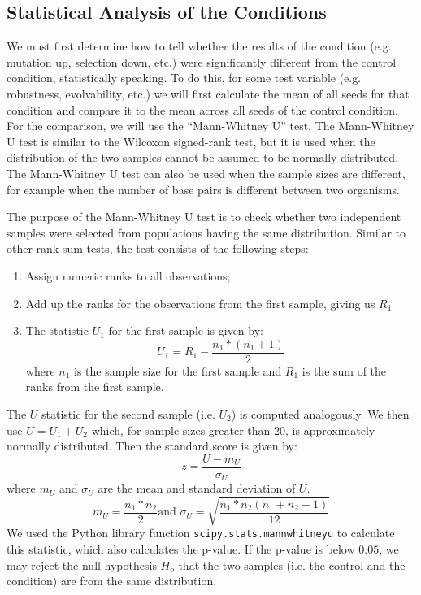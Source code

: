 \subsection{Statistical Analysis of the Conditions}
We must first determine how to tell whether the results of the condition (e.g. mutation up, selection down, etc.) were significantly different from the control condition, statistically speaking. To do this, for some test variable (e.g. robustness, evolvability, etc.) we will first calculate the mean of all seeds for that condition and compare it to the mean across all seeds of the control condition. For the comparison,  we will use the ``Mann-Whitney U'' test. The Mann-Whitney U test is similar to the Wilcoxon signed-rank test, but it is used when the distribution of the two samples cannot be assumed to be normally distributed. The Mann-Whitney U test can also be used when the sample sizes are different, for example when the number of base pairs is different between two organisms. 

The purpose of the Mann-Whitney U test is to check whether two independent samples were selected from populations having the same distribution. Similar to other rank-sum tests, the test consists of the following steps:
\begin{enumerate}
	\item Assign numeric ranks to all observations;
	\item Add up the ranks for the observations from the first sample, giving us $R_1$
	\item The statistic $U_1$ for the first sample is given by:
	\begin{equation*}
	U_1 = R_1 - \frac{n_1*(n_1 + 1)}{2}
	\end{equation*}
	where $n_1$ is the sample size for the first sample and $R_1$ is the sum of the ranks from the first sample.
\end{enumerate}
The $U$ statistic for the second sample (i.e. $U_2$) is computed analogously. We then use $U = U_1 + U_2$ which, for sample sizes greater than 20, is approximately normally distributed. Then the standard score is given by:
\begin{equation*}
z = \frac{U - m_U}{\sigma_U}
\end{equation*}
where $m_U$ and $\sigma_U$ are the mean and standard deviation of $U$.
\begin{equation*}
m_U = \frac{n_1*n_2}{2} \text{and } \sigma_U = \sqrt{\frac{n_1*n_2\left(n_1 + n_2 +1\right)}{12}}
\end{equation*} We used the Python library function \texttt{scipy.stats.mannwhitneyu} to calculate this statistic, which also calculates the p-value. If the p-value is below $0.05$, we may reject the null hypothesis $H_o$ that the two samples (i.e. the control and the condition) are from the same distribution.

